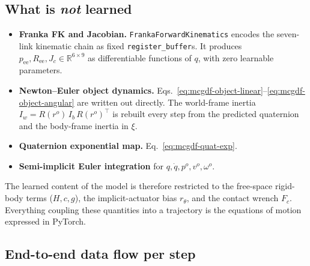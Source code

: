 \documentclass[11pt]{article}
\begin{document}
\subsection{What is \emph{not} learned}

\begin{itemize}
  \item \textbf{Franka FK and Jacobian.} \texttt{FrankaForwardKinematics}
    encodes the seven-link kinematic chain as fixed
    \texttt{register\_buffer}s. It produces $p_{\mathrm{ee}}, R_{\mathrm{ee}},
    J_c \in \mathbb{R}^{6\times 9}$ as differentiable functions of $q$, with
    zero learnable parameters.
  \item \textbf{Newton--Euler object dynamics.}
    Eqs.~\eqref{eq:mcgdf-object-linear}--\eqref{eq:mcgdf-object-angular} are
    written out directly. The world-frame inertia
    $I_w = R(r^o)\,I_b\,R(r^o)^\top$ is rebuilt every step from the predicted
    quaternion and the body-frame inertia in $\xi$.
  \item \textbf{Quaternion exponential map.} Eq.~\eqref{eq:mcgdf-quat-exp}.
  \item \textbf{Semi-implicit Euler integration} for
    $q, \dot q, p^o, v^o, \omega^o$.
\end{itemize}

The learned content of the model is therefore restricted to the
free-space rigid-body terms ($H, c, g$), the implicit-actuator bias
$r_\theta$, and the contact wrench $F_c$. Everything coupling these
quantities into a trajectory is the equations of motion expressed in
PyTorch.

\subsection{End-to-end data flow per step}
\end{document}
